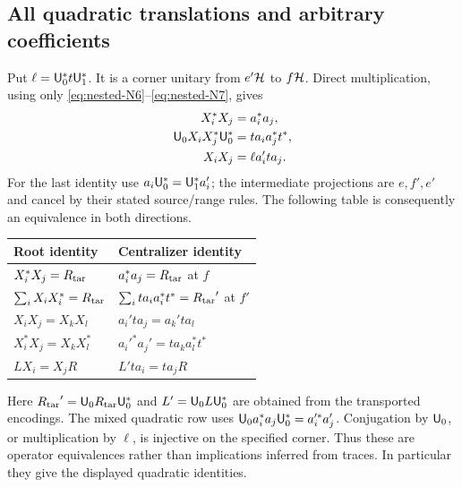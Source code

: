 \subsection{All quadratic translations and arbitrary coefficients}
Put $\ell={\mathsf U}_0^*t{\mathsf U}_1^*$. It is a corner unitary from $e'\mathcal H$ to $f\mathcal H$.
Direct multiplication, using only \eqref{eq:nested-N6}--\eqref{eq:nested-N7}, gives
\begin{align}
 X_i^*X_j&=a_i^*a_j,\label{nested:eq:innernew}\\
 {\mathsf U}_0X_iX_j^*{\mathsf U}_0^*&=ta_ia_j^*t^*,\label{nested:eq:rangenew}\\
 X_iX_j&=\ell a_i'ta_j.\label{nested:eq:productnew}
\end{align}
For the last identity use $a_i{\mathsf U}_0^*={\mathsf U}_1^*a_i'$; the intermediate
projections are $e,f',e'$ and cancel by their stated source/range rules.
The following table is consequently an equivalence in both directions.
\begin{center}\small
\begin{tabular}{@{}ll@{}}
\toprule Root identity & Centralizer identity\\\midrule
$X_i^*X_j={R_{\rm tar}}$ & $a_i^*a_j={R_{\rm tar}}$ at $f$\\
$\sum_iX_iX_i^*={R_{\rm tar}}$ & $\sum_i ta_ia_i^*t^*={R_{\rm tar}}'$ at $f'$\\
$X_iX_j=X_kX_l$ & $a_i'ta_j=a_k'ta_l$\\
$X_i^*X_j=X_kX_l^*$ & $a_i'^*a_j'=ta_ka_l^*t^*$\\
$LX_i=X_jR$ & $L'ta_i=ta_jR$\\\bottomrule
\end{tabular}
\end{center}
Here ${R_{\rm tar}}'={\mathsf U}_0{R_{\rm tar}}{\mathsf U}_0^*$ and $L'={\mathsf U}_0L{\mathsf U}_0^*$ are obtained from the
transported encodings. The mixed quadratic row uses
${\mathsf U}_0a_i^*a_j{\mathsf U}_0^*=a_i'^*a_j'$. Conjugation by ${\mathsf U}_0$, or multiplication
by $\ell$, is injective on the specified corner. Thus these are
operator equivalences rather than implications inferred from traces.
In particular they give the displayed quadratic identities.

